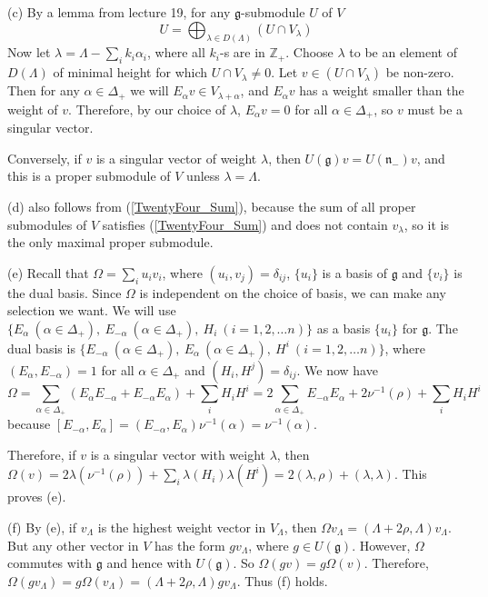 \documentclass[11pt]{article}
\begin{document}
(c) By a lemma from lecture 19, for any ${\mathfrak g}$-submodule $U$ of $V$
\begin{equation} \label{TwentyFour_Sum}
U = \bigoplus_{\lambda \in D(\Lambda)} (U \cap V_\lambda)
\end{equation}
Now let $\lambda = \Lambda - \sum_i k_i \alpha_i$, where all $k_i$-s are in $\mathbb{Z}_+$. Choose $\lambda$ to be an element of $D(\Lambda)$ of minimal height for which $U \cap V_\lambda \neq 0$. Let $v \in (U \cap V_\lambda)$ be non-zero. Then for any $\alpha \in \Delta_+$ we will $E_\alpha v \in V_{\lambda + \alpha}$, and $E_\alpha v$ has a weight smaller than the weight of $v$. Therefore, by our choice of $\lambda$, $E_\alpha v = 0$ for all $\alpha \in \Delta_+$, so $v$ must be a singular vector.

Conversely, if $v$ is a singular vector of weight $\lambda$, then $U({\mathfrak g})v = U({\mathfrak n}_-)v$, and this is a proper submodule of $V$ unless $\lambda = \Lambda$.

(d) also follows from (\ref{TwentyFour_Sum}), because the sum of all proper submodules of $V$ satisfies (\ref{TwentyFour_Sum}) and does not contain $v_\lambda$, so it is the only maximal proper submodule.

(e) Recall that $\Omega = \sum_i u_i v_i$, where $(u_i, v_j)=\delta_{ij}$, $\{ u_i \}$ is a basis of ${\mathfrak g}$ and $\{ v_i \}$ is the dual basis. Since $\Omega$ is independent on the choice of basis, we can make any selection we want. We will use $\{ E_\alpha \ (\alpha \in \Delta_+),\ E_{-\alpha} \ (\alpha \in \Delta_+), \ H_i \ (i=1,2, \ldots n )\}$ as a basis $\{ u_i \}$ for ${\mathfrak g}$. The dual basis is $\{ E_{-\alpha} \ (\alpha \in \Delta_+),\ E_{\alpha} \ (\alpha \in \Delta_+), \ H^i \ (i=1,2, \ldots n )\}$, where $(E_\alpha, E_{-\alpha}) = 1$ for all $\alpha \in \Delta_+$ and $(H_i, H^j)=\delta_{ij}$. We now have
$$
\Omega = \sum_{\alpha \in \Delta_+}(E_\alpha E_{-\alpha} + E_{-\alpha}E_\alpha) + \sum_i H_i H^i = 2 \sum_{\alpha \in \Delta_+} E_{-\alpha}E_\alpha + 2\nu^{-1}(\rho) + \sum_i H_iH^i
$$
because $[E_{-\alpha}, E_\alpha]=(E_{-\alpha}, E_\alpha)\nu^{-1} (\alpha) = \nu^{-1}(\alpha)$.

Therefore, if $v$ is a singular vector with weight $\lambda$, then $\Omega (v) = 2 \lambda (\nu^{-1}(\rho)) + \sum_i\lambda(H_i) \lambda (H^i) = 2 (\lambda, \rho) + (\lambda, \lambda)$. This proves (e).

(f) By (e), if $v_\Lambda$ is the highest weight vector in $V_\Lambda$, then $\Omega v_\Lambda = (\Lambda + 2\rho, \Lambda) v_\Lambda$. But any other vector in $V$ has the form $g v_\Lambda$, where $g \in U({\mathfrak g})$. However, $\Omega$ commutes with ${\mathfrak g}$ and hence with $U({\mathfrak g})$. So $\Omega(gv)=g\Omega(v)$. Therefore, $\Omega (g v_\Lambda) = g \Omega (v_\Lambda) = (\Lambda + 2\rho, \Lambda) g v_\Lambda$. Thus (f) holds.
\end{document}

